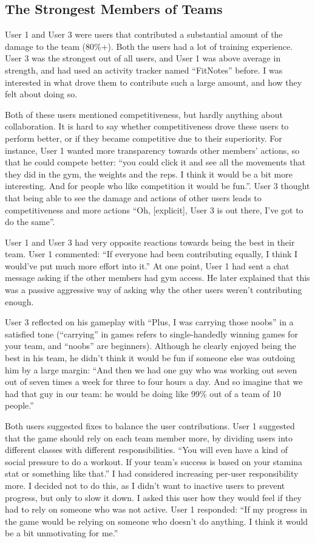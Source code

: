 \documentclass{l4proj}
\begin{document}
\subsection{The Strongest Members of Teams}
User 1 and User 3 were users that contributed a substantial amount of the damage to the team (80\%+). Both the users had a lot of training experience. User 3 was the strongest out of all users, and User 1 was above average in strength, and had used an activity tracker named ``FitNotes'' before. I was interested in what drove them to contribute such a large amount, and how they felt about doing so. 

Both of these users mentioned competitiveness, but hardly anything about collaboration. It is hard to say whether competitiveness drove these users to perform better, or if they became competitive due to their superiority. For instance, User 1 wanted more transparency towards other members' actions, so that he could compete better: ``you could click it and see all the movements that they did in the gym, the weights and the reps. I think it would be a bit more interesting. And for people who like competition it would be fun.''. User 3 thought that being able to see the damage and actions of other users leads to competitiveness and more actions ``Oh, [explicit], User 3 is out there, I've got to do the same''. 

User 1 and User 3 had very opposite reactions towards being the best in their team. User 1 commented: ``If everyone had been contributing equally, I think I would've put much more effort into it.'' At one point, User 1 had sent a chat message asking if the other members had gym access. He later explained that this was a passive aggressive way of asking why the other users weren't contributing enough. 

User 3 reflected on his gameplay with ``Plus, I was carrying those noobs'' in a satisfied tone (``carrying'' in games refers to single-handedly winning games for your team, and ``noobs'' are beginners). Although he clearly enjoyed being the best in his team, he didn't think it would be fun if someone else was outdoing him by a large margin: ``And then we had one guy who was working out seven out of seven times a week for three to four hours a day. And so imagine that we had that guy in our team: he would be doing like 99\% out of a team of 10 people.'' 

Both users suggested fixes to balance the user contributions. User 1 suggested that the game should rely on each team member more, by dividing users into different classes with different responsibilities. ``You will even have a kind of social pressure to do a workout. If your team's success is based on your stamina stat or something like that.'' I had considered increasing per-user responsibility more. I decided not to do this, as I didn't want to inactive users to prevent progress, but only to slow it down. I asked this user how they would feel if they had to rely on someone who was not active. User 1 responded: ``If my progress in the game would be relying on someone who doesn't do anything. I think it would be a bit unmotivating for me.'' 
\end{document}
